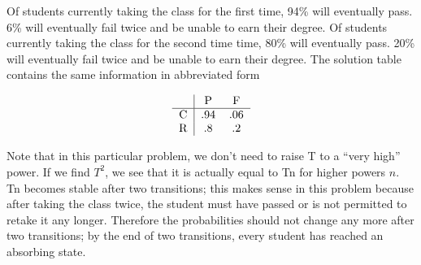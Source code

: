 Of students currently taking the class for the first time, 94\% will eventually pass. 6\% will eventually fail twice and be unable to earn their degree. Of students currently taking the class for the second time time, 80\% will eventually pass. 20\% will eventually fail twice and be unable to earn their degree. The solution table contains the same information in abbreviated form

\[
    \begin{tabular}{c|cc}
          & P   & F   \\
        \hline
        C & .94 & .06 \\
        R & .8  & .2
    \end{tabular}
\]

Note that in this particular problem, we don’t need to raise T to a “very high” power.  If we find $T^2$, we see that it is actually equal to Tn for higher powers $n$.  Tn becomes stable after two transitions; this makes sense in this problem because after taking the class twice, the student must have passed or is not permitted to retake it any longer.  Therefore the probabilities should not change any more after two transitions; by the end of two transitions, every student has reached an absorbing state.


